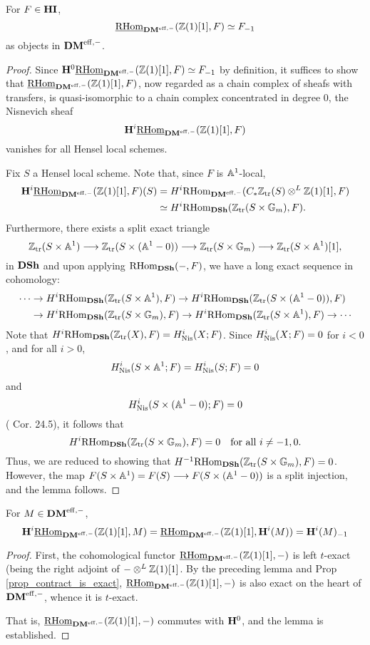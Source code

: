 \begin{lem}[D\'eglise]\label{lem_rhomDM_and_contract}
For $F \in \HI$,
\[
\ihomDMf(\Z(1)[1], F) \simeq \RHI{F}
\]
as objects in $\DMeff$.
\end{lem}
\begin{proof}
Since $\HH^0 \ihomDMf(\Z(1)[1], F) \simeq \RHI{F}$ by definition, 
it suffices to show that $\ihomDMf(\Z(1)[1], F)$, now regarded as 
a chain complex of sheafs with transfers, is quasi-isomorphic to a 
chain complex concentrated in degree 0, the Nisnevich sheaf
\[
\HH^i\ihomDMf(\Z(1)[1], F)
\]
vanishes for all Hensel local schemes.

Fix $S$ a Hensel local scheme. Note that, since $F$ is $\A^1$-local,
\begin{align*}
\HH^i\ihomDMf(\Z(1)[1], F)(S) &= H^i\rhomDMf(\CZtr(S) 
   \tDM \Z(1)[1], F) \\
   &\simeq H^i\homDSh(\Ztr(S \times 
   \Gm), F).
\end{align*}
Furthermore, there exists a split exact triangle
\[
\Ztr(S \times \A^1) \to \Ztr(S \times (\A^1 - 0)) \to 
   \Ztr(S \times \Gm) \to \Ztr(S \times \A^1)[1],
\]
in $\DSh$ and upon applying $\homDSh(-, F)$, we have a long exact 
sequence in cohomology:
\begin{align*}
\cdots & \rightarrow H^i\homDSh(\Ztr(S \times \A^1), F) 
   \rightarrow H^i\homDSh(\Ztr(S \times (\A^1 - 0)), F) \\
 & \rightarrow H^i\homDSh(\Ztr(S \times \Gm), F) \rightarrow 
   H^i\homDSh(\Ztr(S \times \A^1), F) \rightarrow \cdots
\end{align*}
Note that $H^i\homDSh(\Ztr(X), F) = H_{\Nis}^i(X; F)$. Since
$H^i_{\Nis}(X; F) = 0$ for $i < 0$, and for all $i > 0$, 
\[
H_{\Nis}^i(S \times \A^1; F) = H_{\Nis}^i(S; F) = 0
\] 
and 
\[
H_{\Nis}^i(S \times (\A^1 - 0); F) = 0
\] 
(\cite{MVW} Cor. 24.5), it follows that 
\[
H^i\homDSh(\Ztr(S \times \Gm), F) = 0 \quad\textrm{for all $i \neq -1, 0$.}
\] 
Thus, we are reduced to showing that $H^{-1}\homDSh(\Ztr(S \times 
\Gm), F) = 0$. However, the map $F(S \times \A^1) = F(S) \to F(S 
\times (\A^1 - 0))$ is a split injection, and the lemma follows.
\end{proof}

\begin{lem}[D\'eglise]\label{lem_H_com_ihom_DM}
For $M \in \DMeff$, 
\[
\HH^i\ihomDMf(\Z(1)[1], M) = \ihomDMf(\Z(1)[1], \HH^i(M)) = 
   \RHI{\HH^i(M)}
\]
\end{lem}
\begin{proof}
First, the cohomological functor $\ihomDMf(\Z(1)[1], -)$ is left 
$t$-exact (being the right adjoint of $-\tDM \Z(1)[1]$. By the 
preceding lemma and Prop \ref{prop_contract_is_exact},
$\ihomDMf(\Z(1)[1], -)$ is also exact on the heart of $\DMeff$,
whence it is $t$-exact.

That is, $\ihomDMf(\Z(1)[1], -)$ commutes with $\HH^0$,
and the lemma is established.
\end{proof}

